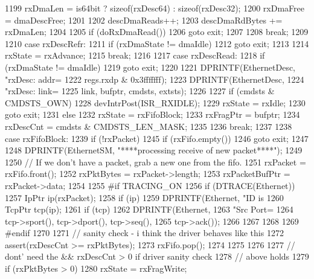 \begin{DoxyCode}
{{{1199             rxDmaLen = is64bit ? sizeof(rxDesc64) : sizeof(rxDesc32);
1200             rxDmaFree = dmaDescFree;
1201 
1202             descDmaReads++;
1203             descDmaRdBytes += rxDmaLen;
1204 
1205             if (doRxDmaRead())
1206                 goto exit;
1207         }
1208         break;
1209 
1210       case rxDescRefr:
1211         if (rxDmaState != dmaIdle)
1212             goto exit;
1213 
1214         rxState = rxAdvance;
1215         break;
1216 
1217      case rxDescRead:
1218         if (rxDmaState != dmaIdle)
1219             goto exit;
1220 
1221         DPRINTF(EthernetDesc, "rxDesc: addr=%
1222                 regs.rxdp & 0x3fffffff);
1223         DPRINTF(EthernetDesc,
1224                 "rxDesc: link=%
1225                 link, bufptr, cmdsts, extsts);
1226 
1227         if (cmdsts & CMDSTS_OWN) {
1228             devIntrPost(ISR_RXIDLE);
1229             rxState = rxIdle;
1230             goto exit;
1231         } else {
1232             rxState = rxFifoBlock;
1233             rxFragPtr = bufptr;
1234             rxDescCnt = cmdsts & CMDSTS_LEN_MASK;
1235         }
1236         break;
1237 
1238       case rxFifoBlock:
1239         if (!rxPacket) {
1245             if (rxFifo.empty())
1246                 goto exit;
1247 
1248             DPRINTF(EthernetSM, "****processing receive of new packet****\n");
1249 
1250             // If we don't have a packet, grab a new one from the fifo.
1251             rxPacket = rxFifo.front();
1252             rxPktBytes = rxPacket->length;
1253             rxPacketBufPtr = rxPacket->data;
1254 
1255 #if TRACING_ON
1256             if (DTRACE(Ethernet)) {
1257                 IpPtr ip(rxPacket);
1258                 if (ip) {
1259                     DPRINTF(Ethernet, "ID is %
1260                     TcpPtr tcp(ip);
1261                     if (tcp) {
1262                         DPRINTF(Ethernet,
1263                                 "Src Port=%
1264                                 tcp->sport(), tcp->dport(), tcp->seq(),
1265                                 tcp->ack());
1266                     }
1267                 }
1268             }
1269 #endif
1270 
1271             // sanity check - i think the driver behaves like this
1272             assert(rxDescCnt >= rxPktBytes);
1273             rxFifo.pop();
1274         }
1275 
1276 
1277         // dont' need the && rxDescCnt > 0 if driver sanity check
1278         // above holds
1279         if (rxPktBytes > 0) {
1280             rxState = rxFragWrite;
}}}
\end{DoxyCode}
